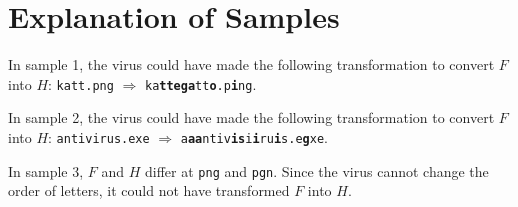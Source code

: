 \section*{Explanation of Samples}
In sample 1, the virus could have made the following transformation to convert $F$ into $H$:
\texttt{katt.png} $\Rightarrow$ \texttt{ka\textbf{ttega}tt\textbf{o}.p\textbf{i}ng}.


In sample 2, the virus could have made the following transformation to convert $F$ into $H$:
\texttt{antivirus.exe} $\Rightarrow$ \texttt{a\textbf{aa}ntiv\textbf{is}i\textbf{i}ru\textbf{i}s.e\textbf{g}xe}.


In sample 3, $F$ and $H$ differ at \texttt{png} and \texttt{pgn}. Since the virus cannot change the order of letters,
it could not have transformed $F$ into $H$.
